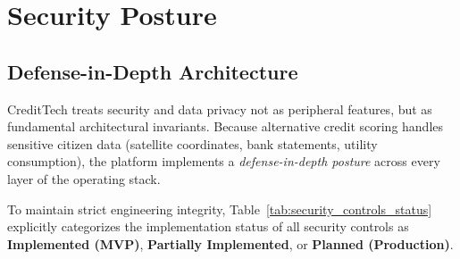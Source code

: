\chapter{Security Posture}
\label{chap:security_posture}

\section{Defense-in-Depth Architecture}
CreditTech treats security and data privacy not as peripheral features, but as fundamental architectural invariants. Because alternative credit scoring handles sensitive citizen data (satellite coordinates, bank statements, utility consumption), the platform implements a \textit{defense-in-depth posture} across every layer of the operating stack. 

To maintain strict engineering integrity, Table~\ref{tab:security_controls_status} explicitly categorizes the implementation status of all security controls as \textbf{Implemented (MVP)}, \textbf{Partially Implemented}, or \textbf{Planned (Production)}.

